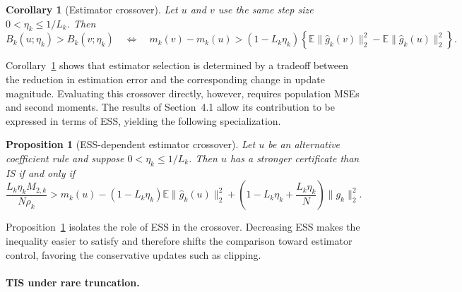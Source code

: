 \documentclass[11pt]{article}
\newtheorem{proposition}[theorem]{Proposition}
\newtheorem{corollary}[theorem]{Corollary}
\theoremstyle{remark}
\newcommand{\E}{\mathbb{E}}
\begin{document}
\begin{corollary}[Estimator crossover]
\label{cor:certificate-crossover}
Let $u$ and $v$ use the same step size $0<\eta_k\le1/L_k$. Then
\begin{equation}
 B_k(u;\eta_k)>B_k(v;\eta_k)
 \quad\Longleftrightarrow\quad
 m_k(v)-m_k(u)
 >
 (1-L_k\eta_k)
 \left\{
 \E\|\widehat g_k(v)\|_2^2
 -
 \E\|\widehat g_k(u)\|_2^2
 \right\}.
 \label{eq:general-estimator-crossover}
\end{equation}
\end{corollary}

Corollary~\ref{cor:certificate-crossover} shows that estimator selection is
determined by a tradeoff between the reduction in estimation error and the
corresponding change in update magnitude. Evaluating this crossover directly,
however, requires population MSEs and second moments. The results of Section~4.1 allow its contribution to be expressed in terms of ESS, yielding the following specialization.

\begin{proposition}[ESS-dependent estimator crossover]
\label{prop:ess-estimator-crossover}
Let $u$ be an alternative coefficient rule and suppose
$0<\eta_k\le1/L_k$. Then $u$ has a stronger certificate than IS if and only if
\begin{equation}
 \frac{L_k\eta_k M_{2,k}}{N\rho_k}
 >
 m_k(u)
 -
 (1-L_k\eta_k)
 \E\|\widehat g_k(u)\|_2^2
 +
 \left(
 1-L_k\eta_k+\frac{L_k\eta_k}{N}
 \right)
 \|g_k\|_2^2 .
 \label{eq:ess-estimator-crossover}
\end{equation}
\end{proposition}

Proposition~\ref{prop:ess-estimator-crossover} isolates the role of ESS in the crossover. Decreasing ESS makes the inequality easier to satisfy and therefore shifts the comparison toward estimator control, favoring the conservative updates such as clipping. 



\paragraph{TIS under rare truncation.}
\end{document}
